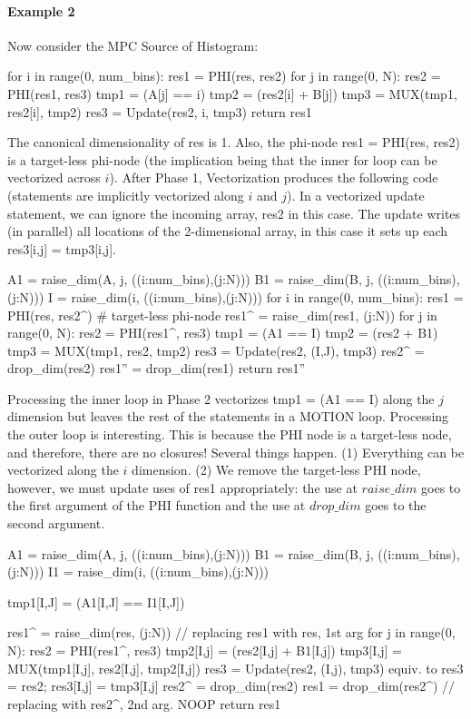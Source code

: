 \paragraph{Example 2} Now consider the MPC Source of Histogram:

{\small
\begin{pythonn}
for i in range(0, num_bins):
  res1 = PHI(res, res2)
  for j in range(0, N):
    res2 = PHI(res1, res3)
    tmp1 = (A[j] == i)
    tmp2 = (res2[i] + B[j])
    tmp3 = MUX(tmp1, res2[i], tmp2)
    res3 = Update(res2, i, tmp3)
return res1
\end{pythonn}
}

The canonical dimensionality of {\sf res} is 1. Also, the phi-node {\sf res1 = PHI(res, res2)} is a target-less phi-node (the implication being that the inner for loop can be vectorized across $i$). After Phase 1, Vectorization produces the following code (statements are implicitly vectorized along $i$ and $j$). In a vectorized update statement, we can ignore the incoming array, {\sf res2} in this case. The update writes (in parallel) all locations of the 2-dimensional array, in this case it sets up each {\sf res3[i,j] = tmp3[i,j]}.

{\small
\begin{pythonn}
A1 = raise_dim(A, j, ((i:num_bins),(j:N)))
B1 = raise_dim(B, j, ((i:num_bins),(j:N)))
I = raise_dim(i, ((i:num_bins),(j:N)))
for i in range(0, num_bins):
   res1 = PHI(res, res2^) # target-less phi-node
   res1^ = raise_dim(res1, (j:N))
   for j in range(0, N):
     res2 = PHI(res1^, res3)
     tmp1 = (A1 == I)
     tmp2 = (res2 + B1)
     tmp3 = MUX(tmp1, res2, tmp2)
     res3 = Update(res2, (I,J), tmp3)
   res2^ = drop_dim(res2)
res1'' = drop_dim(res1)
return res1''
\end{pythonn}
}

Processing the inner loop in Phase 2 vectorizes {\sf tmp1 = (A1 == I)} along the $j$ dimension but leaves the rest of the statements in a MOTION loop. Processing the outer loop is interesting. This is because the PHI node is a target-less node, and therefore, there are no closures! Several things happen. (1) Everything can be vectorized along the $i$ dimension. (2) We remove the target-less PHI node, however, we must update uses of {\sf res1} appropriately: the use at $\mathit{raise\_dim}$ goes to the first argument of the PHI function and the use at $\mathit{drop\_dim}$ goes to the second argument.

{\small
\begin{pythonn}
A1 = raise_dim(A, j, ((i:num_bins),(j:N)))
B1 = raise_dim(B, j, ((i:num_bins),(j:N)))
I1 = raise_dim(i, ((i:num_bins),(j:N)))

tmp1[I,J] = (A1[I,J] == I1[I,J])

res1^ = raise_dim(res, (j:N)) // replacing res1 with res, 1st arg
for j in range(0, N):
   res2 = PHI(res1^, res3)
   tmp2[I,j] = (res2[I,j] + B1[I,j])
   tmp3[I,j] = MUX(tmp1[I,j], res2[I,j], tmp2[I,j])
   res3 = Update(res2, (I,j), tmp3)
   equiv. to res3 = res2; res3[I,j] = tmp3[I,j]
res2^ = drop_dim(res2)
res1 = drop_dim(res2^) // replacing with res2^, 2nd arg. NOOP
return res1
\end{pythonn}
}


